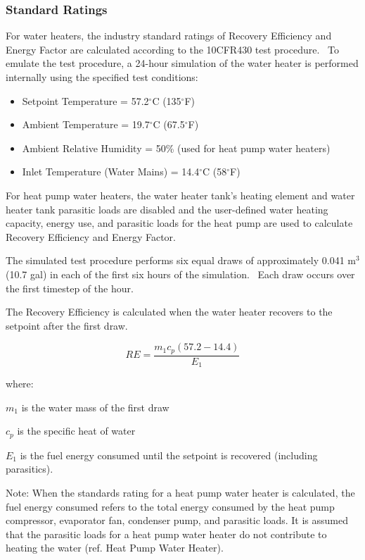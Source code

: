 \subsubsection{Standard Ratings}\label{standard-ratings-000}

For water heaters, the industry standard ratings of Recovery Efficiency and Energy Factor are calculated according to the 10CFR430 test procedure.~ To emulate the test procedure, a 24-hour simulation of the water heater is performed internally using the specified test conditions:

\begin{itemize}
\item Setpoint Temperature = 57.2\(^{\circ}\)C (135\(^{\circ}\)F)
\item Ambient Temperature = 19.7\(^{\circ}\)C (67.5\(^{\circ}\)F)
\item Ambient Relative Humidity = 50\% (used for heat pump water heaters)
\item Inlet Temperature (Water Mains) = 14.4\(^{\circ}\)C (58\(^{\circ}\)F)
\end{itemize}

For heat pump water heaters, the water heater tank's heating element and water heater tank parasitic loads are disabled and the user-defined water heating capacity, energy use, and parasitic loads for the heat pump are used to calculate Recovery Efficiency and Energy Factor.

The simulated test procedure performs six equal draws of approximately 0.041 m\(^{3}\) (10.7 gal) in each of the first six hours of the simulation.~ Each draw occurs over the first timestep of the hour.

The Recovery Efficiency is calculated when the water heater recovers to the setpoint after the first draw.

\begin{equation}
RE = \frac{{{m_1}{c_p}\left( {57.2 - 14.4} \right)}}{{{E_1}}}
\end{equation}

where:

\(m_{1}\) is the water mass of the first draw

\(c_{p}\) is the specific heat of water

\(E_{1}\) is the fuel energy consumed until the setpoint is recovered (including parasitics).

Note: When the standards rating for a heat pump water heater is calculated, the fuel energy consumed refers to the total energy consumed by the heat pump compressor, evaporator fan, condenser pump, and parasitic loads. It is assumed that the parasitic loads for a heat pump water heater do not contribute to heating the water (ref. Heat Pump Water Heater).

